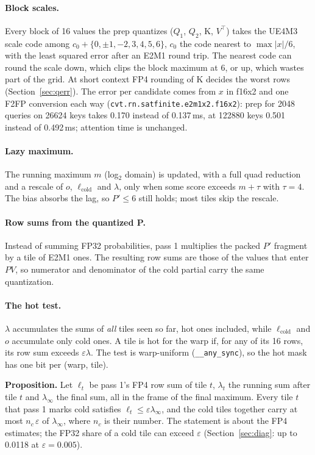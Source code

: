 \documentclass[10pt,twocolumn]{article}
\newcommand{\eps}{\varepsilon}
\newcommand{\code}[1]{\texttt{#1}}
\begin{document}
\paragraph{Block scales.} Every block of 16 values the prep quantizes ($Q_1$, $Q_2$, K, $V^\top$) takes the UE4M3
scale code among $c_0+\{0,\pm1,-2,3,4,5,6\}$, $c_0$ the code nearest to $\max|x|/6$, with the least squared error
after an E2M1 round trip. The nearest code can round the scale down, which clips the block maximum at 6, or up,
which wastes part of the grid. At short context FP4 rounding of K decides the worst rows (Section~\ref{sec:qerr}).
The error per candidate comes from $x$ in f16x2 and one F2FP conversion each way
(\code{cvt.rn.satfinite.e2m1x2.f16x2}): prep for 2048 queries on 26624 keys takes 0.170 instead of 0.137\,ms, at
122880 keys 0.501 instead of 0.492\,ms; attention time is unchanged.

\paragraph{Lazy maximum.} The running maximum $m$ (log$_2$ domain) is updated, with a full quad reduction
and a rescale of $o$, $\ell_{\text{cold}}$ and $\lambda$, only when some score exceeds $m+\tau$ with
$\tau=4$. The bias absorbs the lag, so $P'\le6$ still holds; most tiles skip the rescale.

\paragraph{Row sums from the quantized P.} Instead of summing FP32 probabilities, pass 1 multiplies the packed
$P'$ fragment by a tile of E2M1 ones. The resulting row sums are those of the values that enter $PV$, so
numerator and denominator of the cold partial carry the same quantization.

\paragraph{The hot test.} $\lambda$ accumulates the sums of \emph{all} tiles seen so far, hot ones included,
while $\ell_{\text{cold}}$ and $o$ accumulate only cold ones. A tile is hot for the warp if, for any of its
16 rows, its row sum exceeds $\eps\lambda$. The test is warp-uniform (\code{\_\_any\_sync}), so the hot
mask has one bit per (warp, tile).

\smallskip\noindent\textbf{Proposition.} Let $\ell_t$ be pass 1's FP4 row sum of tile $t$, $\lambda_t$ the
running sum after tile $t$ and $\lambda_\infty$ the final sum, all in the frame of the final maximum. Every tile
$t$ that pass 1 marks cold satisfies $\ell_t\le\eps\lambda_\infty$, and the cold tiles together carry at most
$n_c\,\eps$ of $\lambda_\infty$, where $n_c$ is their number. The statement is about the FP4 estimates; the
FP32 share of a cold tile can exceed $\eps$ (Section~\ref{sec:diag}: up to 0.0118 at $\eps=0.005$).
\end{document}
